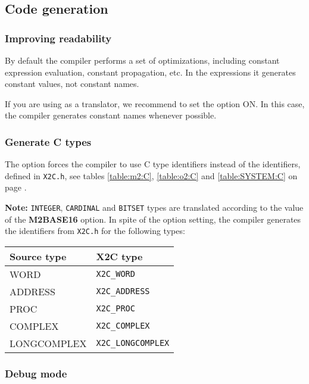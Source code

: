 \subsection{Code generation}\label{maptoc:opt:gen}

\subsubsection{Improving readability}

By default the compiler performs a set of optimizations, including
constant expression evaluation, constant propagation, etc.
In the expressions it generates constant values, not constant names.

If you are using \XDS{} as a translator, we recommend to set the option
 ON. In this case, the
compiler generates constant names whenever possible.

\subsubsection{Generate C types}

The     option
forces the compiler  to  use  C  type  identifiers instead of the identifiers,
defined  in  {\tt  X2C.h}, see tables \ref{table:m2:C}, \ref{table:o2:C}
and \ref{table:SYSTEM:C}\ifonline\else{} on page \pageref{table:m2:C}\fi.

{\bf Note:}
\mt{}  {\tt  INTEGER},  {\tt CARDINAL} and {\tt BITSET} types are
translated according to the value of the {\bf M2BASE16} option.
In spite of the option setting, the compiler generates the identifiers
from {\tt X2C.h} for the following types:
\begin{center}
\begin{tabular}{|l|l|} \hline
\bf Source type & \bf X2C type   \\ \hline
WORD            & \verb+X2C_WORD+              \\
ADDRESS         & \verb+X2C_ADDRESS+           \\
PROC            & \verb+X2C_PROC+              \\
COMPLEX         & \verb+X2C_COMPLEX+           \\
LONGCOMPLEX     & \verb+X2C_LONGCOMPLEX+       \\
\hline
\end{tabular}
\end{center}

\subsubsection{Debug mode}

